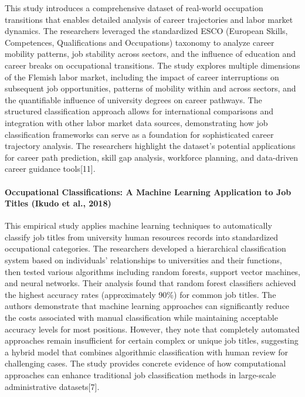 \documentclass[./main.tex]{subfiles}
\begin{document}
This study introduces a comprehensive dataset of real-world occupation
transitions that enables detailed analysis of career trajectories and
labor market dynamics. The researchers leveraged the standardized ESCO
(European Skills, Competences, Qualifications and Occupations) taxonomy
to analyze career mobility patterns, job stability across sectors, and
the influence of education and career breaks on occupational
transitions. The study explores multiple dimensions of the Flemish labor
market, including the impact of career interruptions on subsequent job
opportunities, patterns of mobility within and across sectors, and the
quantifiable influence of university degrees on career pathways. The
structured classification approach allows for international comparisons
and integration with other labor market data sources, demonstrating how
job classification frameworks can serve as a foundation for
sophisticated career trajectory analysis. The researchers highlight the
dataset's potential applications for career path prediction, skill gap
analysis, workforce planning, and data-driven career guidance
tools{[}11{]}.

\paragraph{Occupational Classifications: A Machine Learning
Application to Job Titles (Ikudo et al.,
2018)}\label{occupational-classifications-a-machine-learning-application-to-job-titles-ikudo-et-al.-2018}

This empirical study applies machine learning techniques to
automatically classify job titles from university human resources
records into standardized occupational categories. The researchers
developed a hierarchical classification system based on individuals'
relationships to universities and their functions, then tested various
algorithms including random forests, support vector machines, and neural
networks. Their analysis found that random forest classifiers achieved
the highest accuracy rates (approximately 90\%) for common job titles.
The authors demonstrate that machine learning approaches can
significantly reduce the costs associated with manual classification
while maintaining acceptable accuracy levels for most positions.
However, they note that completely automated approaches remain
insufficient for certain complex or unique job titles, suggesting a
hybrid model that combines algorithmic classification with human review
for challenging cases. The study provides concrete evidence of how
computational approaches can enhance traditional job classification
methods in large-scale administrative datasets{[}7{]}.
\end{document}
